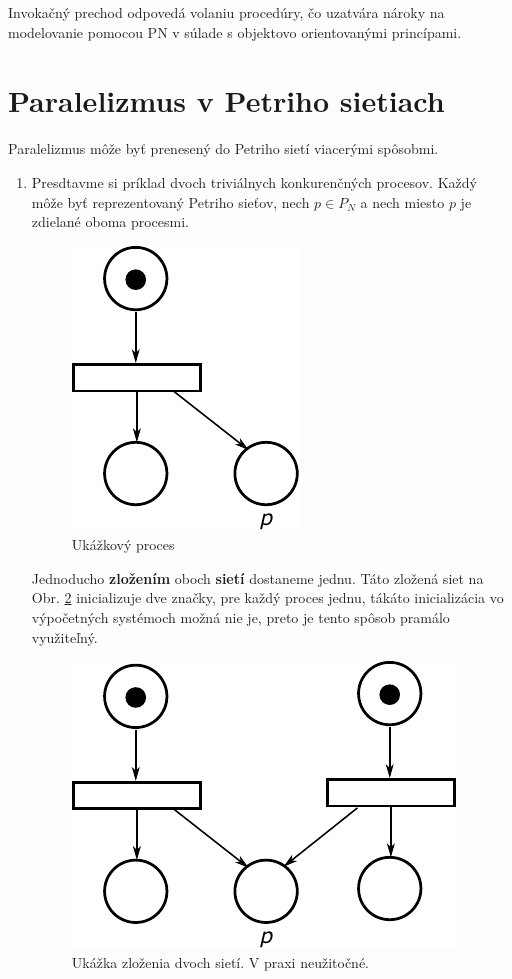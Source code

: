 Invokačný prechod odpovedá volaniu procedúry, čo uzatvára nároky na modelovanie pomocou PN v súlade s objektovo orientovanými princípami.

\section{Paralelizmus v Petriho sietiach}

Paralelizmus môže byť prenesený do Petriho sietí viacerými spôsobmi.
\begin{enumerate}
	\item Presdtavme si príklad dvoch triviálnych konkurenčných procesov. Každý môže byť reprezentovaný Petriho sieťov, nech $p \in P_N$ a nech miesto $p$ je zdielané oboma procesmi. 
	
	\begin{figure}[H]
		\label{fig:example-proc}
		\centering
		\includegraphics[scale=0.5]{obrazky-figures/PN-process1}
		\caption{Ukážkový proces}
	\end{figure}
	
	Jednoducho \textbf{zložením} oboch \textbf{sietí} dostaneme jednu. Táto zložená siet na Obr. \ref{fig:parallel-proc} inicializuje dve značky, pre každý proces jednu, tákáto inicializácia vo výpočetných systémoch možná nie je, preto je tento spôsob pramálo využiteľný.
	
	\begin{figure}[H]
		\label{fig:parallel-proc}
		\centering
		\includegraphics[scale=0.5]{obrazky-figures/PN-parallel2}
		\caption{Ukážka zloženia dvoch sietí. V praxi neužitočné.}
	\end{figure}


\end{enumerate}
